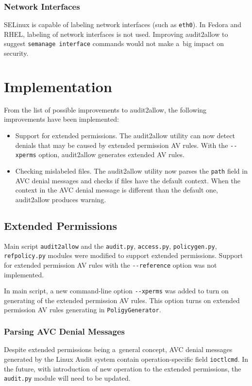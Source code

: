 \subsection{Network Interfaces}
SELinux is capable of labeling network interfaces (such as \texttt{eth0}). In
Fedora and RHEL, labeling of network interfaces is not used. Improving
audit2allow to suggest \texttt{semanage interface} commands would not make a~big
impact on security.

\chapter{Implementation}
\label{implementation}
From the list of possible improvements to audit2allow, the following
improvements have been implemented:
\begin{itemize}
    \item Support for extended permissions. The audit2allow utility can now
        detect denials that may be caused by extended permission AV rules. With
        the \texttt{-{}-xperms} option, audit2allow generates extended AV rules.
    \item Checking mislabeled files. The audit2allow utility now parses the
        \texttt{path} field in AVC denial messages and checks if files have the
        default context. When the context in the AVC denial message is different
        than the default one, audit2allow produces warning.
\end{itemize}

\section{Extended Permissions}
\label{xpermsimp}
Main script \texttt{audit2allow} and the \texttt{audit.py}, \texttt{access.py},
\texttt{policygen.py}, \texttt{refpolicy.py} modules were modified to support
extended permissions. Support for extended permission AV rules with the
\texttt{-{}-reference} option was not implemented.

In main script, a new command-line option \texttt{-{}-xperms} was added to turn
on generating of the extended permission AV rules. This option turns on extended
permission AV rules generating in \texttt{PoligyGenerator}.

\subsection{Parsing AVC Denial Messages}
Despite extended permissions being a~general concept, AVC denial messages
generated by the Linux Audit system contain operation-specific field
\texttt{ioctlcmd}. In the future, with introduction of new operation to the
extended permissions, the \texttt{audit.py} module will need to be updated.

